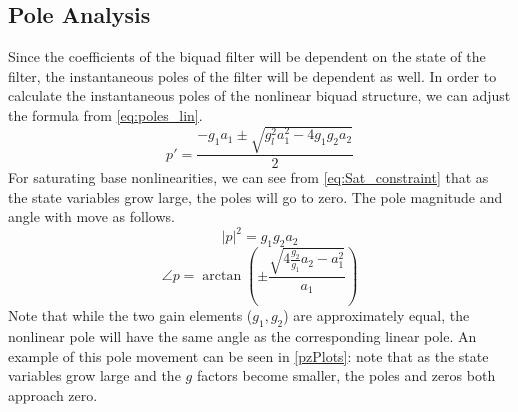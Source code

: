 \documentclass[twoside,a4paper]{article}
\begin{document}
\subsection{Pole Analysis}
%
Since the coefficients of the biquad filter will be dependent on the
state of the filter, the instantaneous poles of the filter will be
dependent as well. In order to calculate the instantaneous poles of
the nonlinear biquad structure, we can adjust the formula from
\cref{eq:poles_lin}.
%
\begin{equation}
    p' = \frac{-g_1 a_1 \pm \sqrt{g_l^2 a_1^2- 4 g_1 g_2 a_2}}{2}
    \label{eq:poles_nl}
\end{equation}
%
For saturating base nonlinearities, we can see from \cref{eq:Sat_constraint}
that as the state variables grow large, the poles will go to zero.
\newline\newline
The pole magnitude and angle with move as follows.
\begin{equation}
    |p|^2 = g_1g_2a_2
    \label{eq:poles_nl_mag}
\end{equation}
%
\begin{equation}
    \angle p = \arctan \left( \pm \frac{\sqrt{4\frac{g_2}{g_1}a_2 - a_1^2}}{a_1} \right)
    \label{eq:poles_nl_angle}
\end{equation}
%
Note that while the two gain elements ($g_1, g_2$) are approximately
equal, the nonlinear pole will have the same angle as the
corresponding linear pole. An example of this pole movement
can be seen in \cref{pzPlots}: note that as the state variables
grow large and the $g$ factors become smaller, the poles and zeros
both approach zero.
%
\end{document}
